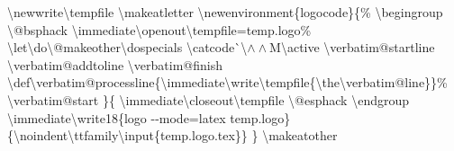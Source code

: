 \resetlinenumber
\begin{linenumbers}\singlespacing\ttfamily
\textbackslash newwrite\textbackslash tempf{}ile\newline
\textbackslash makeatletter\newline
\textbackslash newenvironment\{logocode\}\{\%\newline
\hspace*{1.2em}\textbackslash begingroup\newline
\hspace*{1.2em}\textbackslash @bsphack\newline
\hspace*{1.2em}\textbackslash immediate\textbackslash openout\textbackslash tempf{}ile=temp.logo\%\newline
\hspace*{1.2em}\textbackslash let\textbackslash do\textbackslash @makeother\textbackslash dospecials\newline
\hspace*{1.2em}\textbackslash catcode\`{}\textbackslash$\wedge\wedge$M\textbackslash active\newline
\hspace*{1.2em}\textbackslash verbatim@startline\newline
\hspace*{1.2em}\textbackslash verbatim@addtoline\newline
\hspace*{1.2em}\textbackslash verbatim@finish\newline
\hspace*{1.2em}\textbackslash def\textbackslash verbatim@processline\{\textbackslash immediate\textbackslash write\textbackslash tempf{}ile\{\textbackslash the\textbackslash verbatim@line\}\}\%\newline
\hspace*{1.2em}\textbackslash verbatim@start\newline
\}\{\newline
\hspace*{1.2em}\textbackslash immediate\textbackslash closeout\textbackslash tempf{}ile\newline
\hspace*{1.2em}\textbackslash @esphack\newline
\hspace*{1.2em}\textbackslash endgroup\newline
\hspace*{1.2em}\textbackslash immediate\textbackslash write18\{logo -{}-mode=latex temp.logo\}\newline
\hspace*{1.2em}\{\textbackslash noindent\textbackslash ttfamily\textbackslash input\{temp.logo.tex\}\}\newline
\}\newline
\textbackslash makeatother
\end{linenumbers}

